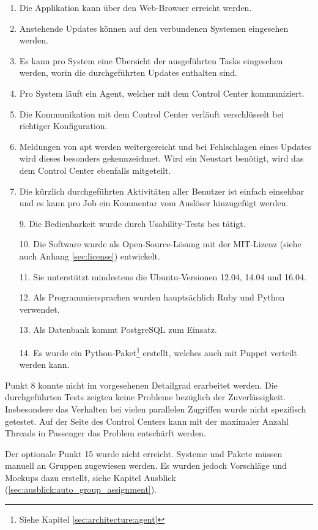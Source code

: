 \begin{enumerate}[noitemsep]
    \item Die Applikation kann über den Web-Browser erreicht werden.
    \item Anstehende Updates können auf den verbundenen Systemen eingesehen werden.
    \item Es kann pro System eine Übersicht der ausgeführten Tasks eingesehen werden, worin die durchgeführten Updates enthalten sind.
    \item Pro System läuft ein Agent, welcher mit dem Control Center kommuniziert.
    \item Die Kommunikation mit dem Control Center verläuft verschlüsselt bei richtiger Konfiguration.
    \item Meldungen von \gls{apt} werden weitergereicht und bei Fehlschlagen eines Updates wird dieses besonders gekennzeichnet. Wird ein Neustart benötigt, wird das dem Control Center ebenfalls mitgeteilt.
    \item Die kürzlich durchgeführten Aktivitäten aller Benutzer ist einfach einsehbar und es kann pro Job ein Kommentar vom Auslöser hinzugefügt werden.
    \item [9.] Die Bedienbarkeit wurde durch Usability-Tests bes    tätigt.
    \item [10.] Die Software wurde als Open-Source-Lösung mit der MIT-Lizenz (siehe auch Anhang \ref{sec:license}) entwickelt.
    \item [11.] Sie unterstützt mindestens die Ubuntu-Versionen 12.04, 14.04 und 16.04.
    \item [12.] Als Programmiersprachen wurden hauptsächlich Ruby und Python verwendet.
    \item [13.] Als Datenbank kommt PostgreSQL zum Einsatz.
    \item [14.] Es wurde ein Python-Paket\footnote{Siehe Kapitel \ref{sec:architecture:agent}} erstellt, welches auch mit Puppet verteilt werden kann.
\end{enumerate}

Punkt 8 konnte nicht im vorgesehenen Detailgrad erarbeitet werden. Die durchgeführten Tests zeigten keine Probleme bezüglich der Zuverlässigkeit. Insbesondere das Verhalten bei vielen parallelen Zugriffen wurde nicht spezifisch getestet. Auf der Seite des Control Centers kann mit der maximaler Anzahl Threads in Passenger das Problem entschärft werden.

\xxx[mehr?]

Der optionale Punkt 15 wurde nicht erreicht. Systeme und Pakete müssen manuell an Gruppen zugewiesen werden. Es wurden jedoch Vorschläge und Mockups dazu erstellt, siehe Kapitel Ausblick (\ref{sec:ausblick:auto_group_assignment}).

